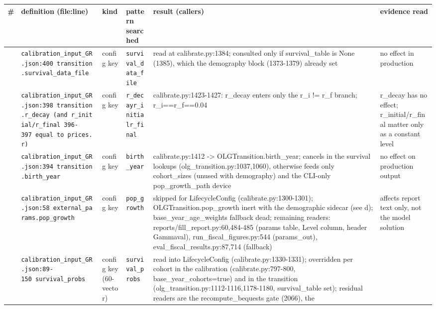 \begin{longtable}{@{}>{\raggedright\arraybackslash}p{0.5cm}>{\raggedright\arraybackslash}p{3.3cm}>{\raggedright\arraybackslash}p{2.0cm}>{\raggedright\arraybackslash}p{2.5cm}>{\raggedright\arraybackslash}p{4.4cm}>{\raggedright\arraybackslash}p{3.4cm}@{}}
\toprule\noalign{}
\# & definition (file:line) & kind & pattern searched & result (callers)
& evidence read \\
\midrule\noalign{}
\endhead
\bottomrule\noalign{}
\endlastfoot
1 &
\texttt{calibration\_input\_GR.json:400\ transition.survival\_data\_file}
& config key & \texttt{survival\_data\_file} & read at
calibrate.py:1384; consulted only if survival\_table is None (1385),
which the demography block (1373-1379) already set & no effect in
production \\
2 &
\texttt{calibration\_input\_GR.json:398\ transition.r\_decay\ (and\ r\_initial/r\_final\ 396-397\ equal\ to\ prices.r)}
& config key & \texttt{r\_decay\textbar{}r\_initial\textbar{}r\_final} &
calibrate.py:1423-1427: r\_decay enters only the r\_i != r\_f branch;
r\_i==r\_f==0.04 & r\_decay has no effect; r\_initial/r\_final matter
only as a constant level \\
3 & \texttt{calibration\_input\_GR.json:394\ transition.birth\_year} &
config key & \texttt{birth\_year} & calibrate.py:1412 -\textgreater{}
OLGTransition.birth\_year; cancels in the survival lookups
(olg\_transition.py:1037,1060), otherwise feeds only cohort\_sizes
(unused with demography) and the CLI-only pop\_growth\_path device & no
effect on production output \\
4 &
\texttt{calibration\_input\_GR.json:58\ external\_params.pop\_growth} &
config key & \texttt{pop\_growth} & skipped for LifecycleConfig
(calibrate.py:1300-1301); OLGTransition.pop\_growth inert with the
demographic sidecar (see d); base\_year\_age\_weights fallback dead;
remaining readers: reports/fill\_report.py:60,484-485 (params table,
Level column, header Gammaval), run\_fiscal\_figures.py:544
(params\_out), eval\_fiscal\_results.py:87,714 (fallback) & affects
report text only, not the model solution \\
5 & \texttt{calibration\_input\_GR.json:89-150\ survival\_probs} &
config key (60-vector) & \texttt{survival\_probs} & read into
LifecycleConfig (calibrate.py:1330-1331); overridden per cohort in the
calibration (calibrate.py:797-800, base\_year\_cohorts=true) and in the
transition (olg\_transition.py:1112-1116,1178-1180, survival\_table
set); residual readers are the recompute\_bequests gate (2066), the

\end{longtable}

